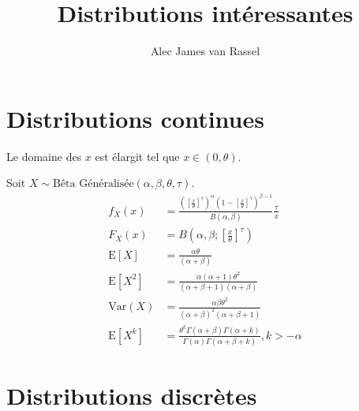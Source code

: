 \documentclass[12pt, titlepage,french]{article}
\begin{document}
\title{Distributions intéressantes}
\vspace{-8ex}
\date{}
\author{Alec James van Rassel}
\maketitle

\tableofcontents
\clearpage

\section{Distributions continues}

\begin{distributions}
Le domaine des $x$ est élargit tel que $x \in (0, \theta)$.

Soit $X \sim \text{Bêta Généralisée}(\alpha, \beta, \theta, \tau)$.
	\begin{align*}
	f_{X}(x)
	&=	\frac{\left(\left[\frac{x}{\theta}\right]^{\tau}\right)^{\alpha} \left(1 - \left[\frac{x}{\theta}\right]^{\tau}\right)^{\beta - 1}}{B(\alpha, \beta)}\frac{\tau}{x}	\\
	F_{X}(x)
	&=	B\left(\alpha, \beta; \left[\frac{x}{\theta}\right]^{\tau}\right)	\\
	\text{E}[X]
	&=	\frac{\alpha \theta}{(\alpha + \beta)}	\\
	\text{E}[X^{2}]
	&=	\frac{\alpha (\alpha + 1) \theta^{2}}{(\alpha + \beta + 1)(\alpha + \beta )}	\\
	\text{Var}(X)
	&=	\frac{\alpha \beta \theta^{2}}{(\alpha + \beta )^{2}(\alpha + \beta + 1)}	\\
	\text{E}[X^{k}]
	&=	\frac{\theta^{k} \Gamma(\alpha + \beta) \Gamma(\alpha + k)}{\Gamma(\alpha) \Gamma(\alpha + \beta + k)}, k > -\alpha
	\end{align*}
\end{distributions}

\clearpage
\section{Distributions discrètes}
\end{document}

